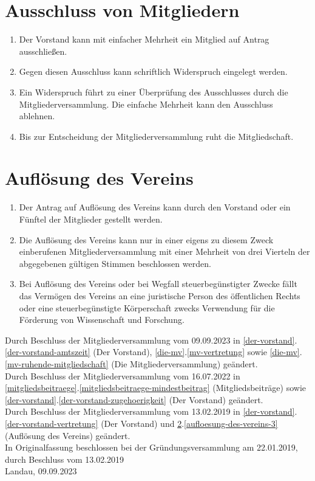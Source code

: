 \documentclass[a4paper, 12pt]{scrartcl}
\begin{document}
\section{Ausschluss von Mitgliedern}
\begin{enumerate}
	\item Der Vorstand kann mit einfacher Mehrheit ein Mitglied auf Antrag ausschließen.
	\item Gegen diesen Ausschluss kann schriftlich Widerspruch eingelegt werden.
	\item Ein Widerspruch führt zu einer Überprüfung des Ausschlusses durch die Mitgliederversammlung. Die einfache Mehrheit kann den Ausschluss ablehnen.
	\item Bis zur Entscheidung der Mitgliederversammlung ruht die Mitgliedschaft.
\end{enumerate}

\section{Auflösung des Vereins}
\label{aufloesung-des-vereins}
\begin{enumerate}
	\item Der Antrag auf Auflösung des Vereins kann durch den Vorstand oder ein Fünftel der Mitglieder gestellt werden.
	\item Die Auflösung des Vereins kann nur in einer eigens zu diesem Zweck einberufenen Mitgliederversammlung mit einer Mehrheit von drei Vierteln der abgegebenen gültigen Stimmen beschlossen werden.
	\item \label{aufloesung-des-vereins-3} Bei Auflösung des Vereins oder bei Wegfall steuerbegünstigter Zwecke fällt das Vermögen des Vereins an eine juristische Person des öffentlichen Rechts oder eine steuerbegünstigte Körperschaft zwecks Verwendung für die Förderung von Wissenschaft und Forschung.
\end{enumerate}

\vspace{2.5cm}

\noindent Durch Beschluss der Mitgliederversammlung vom 09.09.2023 in \ref{der-vorstand}.\ref{der-vorstand-amtszeit} (Der Vorstand), \ref{die-mv}.\ref{mv-vertretung} sowie \ref{die-mv}.\ref{mv-ruhende-mitgliedschaft}  (Die Mitgliederversammlung) geändert.\\
\noindent Durch Beschluss der Mitgliederversammlung vom 16.07.2022 in \ref{mitgliedsbeitraege}.\ref{mitgliedsbeitraege-mindestbeitrag} (Mitgliedsbeiträge) sowie \ref{der-vorstand}.\ref{der-vorstand-zugehoerigkeit} (Der Vorstand) geändert.\\
\noindent Durch Beschluss der Mitgliederversammlung vom 13.02.2019 in \ref{der-vorstand}.\ref{der-vorstand-vertretung} (Der Vorstand) und \ref{aufloesung-des-vereins}.\ref{aufloesung-des-vereins-3} (Auflösung des Vereins) geändert.\\
\noindent In Originalfassung beschlossen bei der Gründungsversammlung am 22.01.2019, durch Beschluss vom 13.02.2019\\
[0.5cm]

\noindent Landau, 09.09.2023
\end{document}
